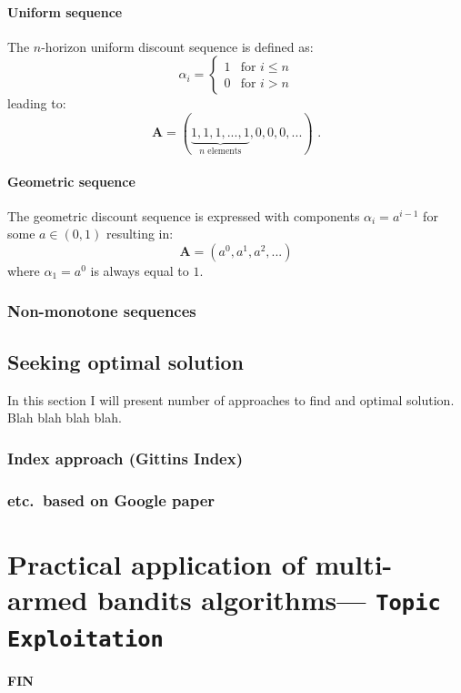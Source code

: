 \documentclass[12pt, a4paper, pdflatex]{report}
\begin{document}
\subsubsection{Uniform sequence}
The $n$-horizon uniform discount sequence is defined as:
\[
 \alpha_i =
  \begin{cases}
   1 & \text{for } i \leq n \\
   0 & \text{for } i > n
  \end{cases}
\]
leading to:
\[
  \mathbf{A} = ( \underbrace{ 1, 1, 1, ..., 1}_{n\text{ elements}}, 0, 0, 0, ... ) \text{ .}
\]
\subsubsection{Geometric sequence}
The geometric discount sequence is expressed with components $\alpha_i = a^{i-1}$ for some $a \in ( 0, 1 )$ resulting in:
$$
\mathbf{A} = \left( a^0, a^1, a^2, ... \right)
$$
where $\alpha_1 = a^0$ is always equal to $1$.

\subsection{Non-monotone sequences}






\section{Seeking optimal solution}
In this section I will present number of approaches to find and optimal solution.\\
Blah blah blah blah.

\subsection{Index approach (Gittins Index)}

\subsection{etc.\ based on Google paper}



\chapter{Practical application of multi-armed bandits algorithms--- \texttt{Topic Exploitation}}

\newpage
\begin{center} \textbf{\huge \vspace{15pt} FIN} \end{center}

{}

\end{document}
